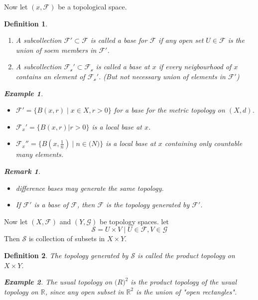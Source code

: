 \documentclass{article}
\newtheorem*{definition}{Definition}
\newtheorem*{remark}{Remark}
\newtheorem*{example}{Example}
\begin{document}
Now let $(x, \mathcal{F})$ be a topological space.
\begin{definition} \hfil
    \begin{enumerate}
        \item A subcollection $\mathcal{F}' \subset \mathcal{F}$ is called a base for $\mathcal{F}$
        if any open set $U \in \mathcal{F}$ is the union of soem members in $\mathcal{F}'$.
        \item A subcollection $\mathcal{F_x}' \subset \mathcal{F_x}$ is called a base at $x$ 
        if every neigbourhood of $x$ contains an element of $\mathcal{F_x}'$.
        (But not necessary union of elements in $\mathcal{F}'$)
    \end{enumerate}
    \begin{example} \hfill
        \begin{itemize}
            \item $\mathcal{F}' = \{B(x, r) \mid x \in X, r > 0\}$ for a base for the metric topology on $(X, d)$.
            \item $\mathcal{F}_x' = \{B(x, r)| r > 0\}$ is a local base at $x$.
            \item $\mathcal{F}_x''= \{B(x, \frac{1}{n}) \mid n \in \mathbb(N)\}$ is a local base at $x$ 
            containing only countable many elements.
        \end{itemize}
    \end{example}
    \begin{remark} \hfil
        \begin{itemize}
            \item difference bases may generate the same topology.
            \item If $\mathcal{F'}$ is a base of $\mathcal{F}$, then $\mathcal{F}$ is the topology generated by $\mathcal{F}'$.
        \end{itemize}
    \end{remark}
\end{definition}
Now let $(X, \mathcal{F})$ and $(Y, \mathcal{G})$ be topology spaces. let
\[
    \mathcal{S} = {U \times V \mid U \in \mathcal{F}, V \in \mathcal{G}}
\]
Then $\mathcal{S}$ is collection of subsets in $X \times Y$.
\begin{definition}
    The topology generated by $\mathcal{S}$ is called the product topology on $X \times Y$.
    \begin{example}
        The usual topology on $\mathbb(R)^2$ is the product topology of the usual topology on $\mathbb{R}$,
        since any open subset in $\mathbb{R}^2$ is the union of "open rectangles".
    \end{example}
\end{definition}
\end{document}
